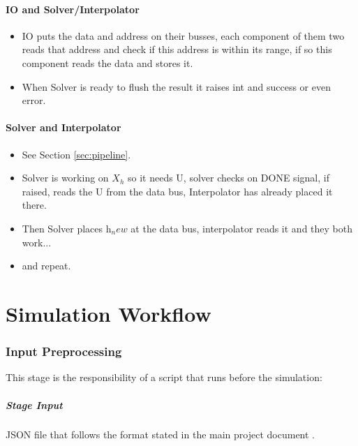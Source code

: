 \documentclass[12pt]{report}
\begin{document}
\subsection{IO and Solver/Interpolator}
\begin{itemize}
    \item IO puts the data and address on their busses, each component of them two reads that address and check if this address is within its range, if so this component reads the data and stores it.
    \item When Solver is ready to flush the result it raises int and success or even error.
\end{itemize}

\subsection{Solver and Interpolator}
\begin{itemize}
    \item See Section \ref{sec:pipeline}.
    \item Solver is working on $X_h$ so it needs U, solver checks on DONE signal, if raised, reads the U from the data bus, Interpolator has already placed it there.
    \item Then Solver places h$_new$ at the data bus, interpolator reads it and they both work...
    \item and repeat.
\end{itemize}

\part{Simulation Workflow}
\section{Input Preprocessing}
This stage is the responsibility of a script that runs before the simulation:
\subsubsection{Stage Input}
JSON file that follows the format stated in the main project document \cite{mainDoc}.
\end{document}
